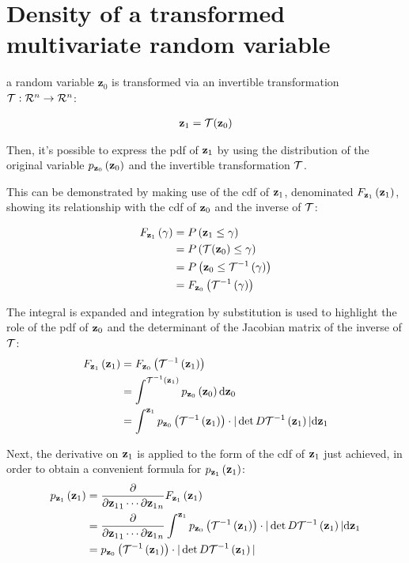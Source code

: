 \section{Density of a transformed multivariate random variable}

a random variable $\mathbf{z}_0$ is transformed via an invertible transformation $\tr: \mathcal{R}^n \rightarrow \mathcal{R}^n$:
    
\begin{align}
\z{1} = \tr(\z{0})
\end{align}

Then, it's possible to express 
the pdf of $\z{1}$
by using the distribution of the original variable $\pz{0}{\z{0}}$ and
the invertible transformation $\tr$.

This can be demonstrated by making use of the cdf of $\z{1}$,
denominated $\Fz{1}{\z{1}}$, showing its relationship with the cdf of $\z{0}$
and the inverse of $\tr$\cite{transformed-density}:

\begin{align}
\Fz{1}{\gamma} &= \Pleq{\z{1}}{\gamma}\\
&= \Pleq{\tr(\z{0})}{\gamma} \\
&= \Pleq{\z{0}}{\trinv{\gamma}} \\
&= \Fz{0}{\trinv{\gamma}}
\end{align}

The integral is expanded and integration by substitution
is used to highlight the role of the pdf of $\z{0}$ and the determinant of
the Jacobian matrix of the inverse of $\tr$:
\begin{align}
\Fz{1}{\z{1}} 
&= \Fz{0}{\trinv{\z{1}}} \\
&=\int^{\trinv{\z{1}}} \pz{0}{\z{0}} \mathrm{d}{\z{0}}\\
&= \int^{\z{1}} \pz{0}{\trinv{\z{1}}} 
\cdot |\det D\trinv{\z{1}} | \mathrm{d}{\z{1}}
\end{align}

Next, the derivative on $\z{1}$ is applied to the form of the 
cdf of $\z{1}$ just achieved, in order
to obtain a convenient formula for $\pz{1}{\z{1}}$:
\begin{align}
\pz{1}{\z{1}} 
&= \multipartial{1} \Fz{1}{\z{1}} \\
&= \multipartial{1}\int^{\z{1}} \pz{0}{\trinv{\z{1}}} 
\cdot |\det D\trinv{\z{1}} | \mathrm{d}{\z{1}} \\
&= \pz{0}{\trinv{\z{1}}} \cdot |\detDtrinv{\z{1}} |
\end{align}

